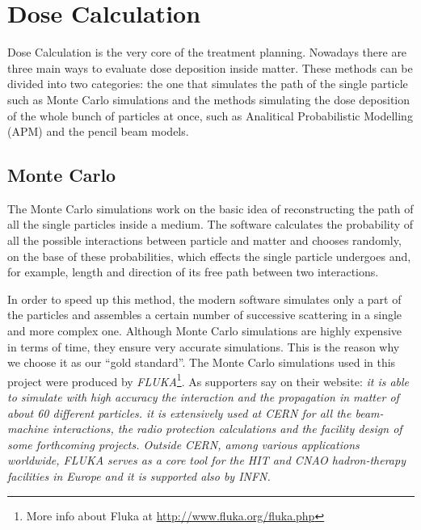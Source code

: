 \documentclass[12pt, a4paper, twoside]{book}
\begin{document}
\section{Dose Calculation}
Dose Calculation is the very core of the treatment planning. 
Nowadays there are three main ways to evaluate dose deposition inside matter. These methods can be divided into two categories: the one that simulates the path of the single particle such as Monte Carlo simulations and the methods simulating the dose deposition of the whole bunch of particles at once, such as Analitical Probabilistic Modelling (APM) and the pencil beam models.




\subsection{Monte Carlo}
The Monte Carlo simulations work on the basic idea of reconstructing the path of all the single particles inside a medium. The software calculates the probability of all the possible interactions between particle and matter and chooses randomly, on the base of these probabilities, which effects the single particle undergoes and, for example, length and direction of its free path between two interactions.

In order to speed up this method, the modern software simulates only a part of the particles and assembles a certain number of successive scattering in a single and more complex one. Although Monte Carlo simulations are highly expensive in terms of time, they ensure very accurate simulations. This is the reason why we choose it as our ``gold standard''.
The Monte Carlo simulations used in this project were produced by \emph{FLUKA}\footnote{More info about Fluka at \url{http://www.fluka.org/fluka.php}}. As supporters say on their website: \emph{it is able to simulate with high accuracy the interaction and the propagation in matter of about 60 different particles. it is extensively used at CERN for all the beam-machine interactions, the radio protection calculations and the facility design of some forthcoming projects. 
Outside CERN, among various applications worldwide, FLUKA serves as a core tool for the HIT and CNAO hadron-therapy facilities in Europe and it is supported also by \emph{INFN}.}
\end{document}
